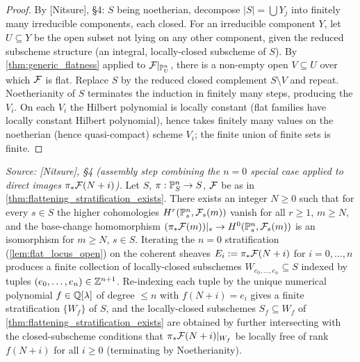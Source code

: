 \begin{proof}
  By [Nitsure], \S4: \(S\) being noetherian, decompose \(|S| = \bigcup Y_j\) into
  finitely many irreducible components, each closed.  For an irreducible
  component \(Y\), let \(U \subseteq Y\) be the open subset not lying on any other
  component, given the reduced subscheme structure (an integral, locally-closed
  subscheme of \(S\)).  By \cref{thm:generic_flatness} applied to
  \(\mathcal{F}|_{\mathbb{P}^n_U}\), there is a non-empty open \(V \subseteq U\) over which \(\mathcal{F}\) is
  flat.  Replace \(S\) by the reduced closed complement \(S \setminus V\) and
  repeat. Noetherianity of \(S\) terminates the induction in finitely many
  steps, producing the \(V_i\).  On each \(V_i\) the Hilbert polynomial is locally
  constant (flat families have locally constant Hilbert polynomial), hence
  takes finitely many values on the noetherian (hence quasi-compact) scheme
  \(V_i\); the finite union of finite sets is finite.
\end{proof}

\begin{lemma}
  \label{lem:noetherian_induction_strata}
  \textit{Source: [Nitsure], \S4 (assembly step combining the \(n=0\) special case
  applied to direct images \(\pi_*\mathcal{F}(N+i)\)).}
  Let \(S\), \(\pi : \mathbb{P}^n_S \to S\), \(\mathcal{F}\) be as in
  \cref{thm:flattening_stratification_exists}.  There exists an integer
  \(N \ge 0\) such that for every \(s \in S\) the higher cohomologies
  \(H^r(\mathbb{P}^n_s, \mathcal{F}_s(m))\) vanish for all \(r \ge 1\), \(m \ge N\), and the base-change
  homomorphism \((\pi_* \mathcal{F}(m))|_s \to H^0(\mathbb{P}^n_s, \mathcal{F}_s(m))\) is an isomorphism
  for \(m \ge N\), \(s \in S\).  Iterating the \(n=0\) stratification
  (\cref{lem:flat_locus_open}) on the coherent sheaves \(E_i := \pi_* \mathcal{F}(N+i)\)
  for \(i = 0, \dots, n\) produces a finite collection of locally-closed
  subschemes \(W_{e_0, \dots, e_n} \subseteq S\) indexed by tuples
  \((e_0, \dots, e_n) \in \mathbb{Z}^{n+1}\). Re-indexing each tuple by the unique
  numerical polynomial \(f \in \mathbb{Q}[\lambda]\) of degree \(\le n\) with
  \(f(N+i) = e_i\) gives a finite stratification \(\{W_f\}\) of \(S\), and the
  locally-closed subschemes \(S_f \subseteq W_f\) of
  \cref{thm:flattening_stratification_exists} are obtained by further
  intersecting with the closed-subscheme conditions that
  \(\pi_* \mathcal{F}(N+i)|_{W_f}\) be locally free of rank \(f(N+i)\) for all \(i \ge 0\)
  (terminating by Noetherianity).
\end{lemma}

